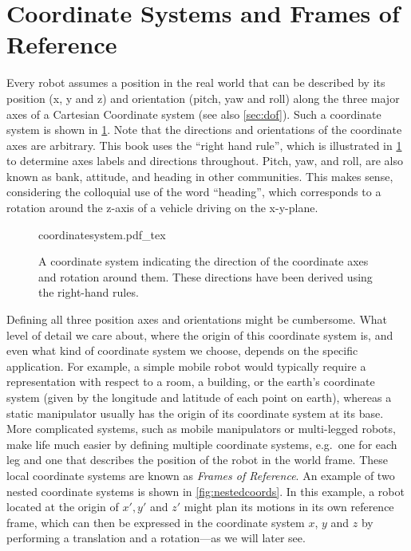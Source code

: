 \section{Coordinate Systems and Frames of Reference}\label{sec:coordsystems}


Every robot assumes a position in the real world that can be described by its position (x, y and z) and orientation (pitch, yaw and roll) along the three major axes of a Cartesian Coordinate system (see also \cref{sec:dof}).
Such a coordinate system is shown in \cref{fig:coordinatesystem}. Note that the directions and orientations of the coordinate axes are arbitrary. This book uses the ``right hand rule'', which is illustrated in \cref{fig:coordinatesystem} to determine axes labels and directions throughout.
Pitch, yaw, and roll, are also known as bank, attitude, and heading in other communities. This makes sense, considering the colloquial use of the word ``heading'', which corresponds to a rotation around the z-axis of a vehicle driving on the x-y-plane.

\begin{figure}
    \centering
    \def\svgwidth{0.8\textwidth}
    {coordinatesystem.pdf_tex}
    \caption{A coordinate system indicating the direction of the coordinate axes and rotation around them. These directions have been derived using the right-hand rules.}
    \label{fig:coordinatesystem}
\end{figure}

Defining all three position axes and orientations might be cumbersome. What level of detail we care about, where the origin of this coordinate system is, and even what kind of coordinate system we choose, depends on the specific application.
For example, a simple mobile robot would typically require a representation with respect to a room, a building, or the earth's coordinate system (given by the longitude and latitude of each point on earth), whereas a static manipulator usually has the origin of its coordinate system at its base.
More complicated systems, such as mobile manipulators or multi-legged robots, make life much easier by defining multiple coordinate systems, e.g.\ one for each leg and one that describes the position of the robot in the world frame. These local coordinate systems are known as \emph{Frames of Reference}.
An example of two nested coordinate systems is shown in \cref{fig:nestedcoords}. In this example, a robot located at the origin of $x',y'$ and $z'$ might plan its motions in its own reference frame, which can then be expressed in the coordinate system $x$, $y$ and $z$ by performing a translation and a rotation---as we will later see.

